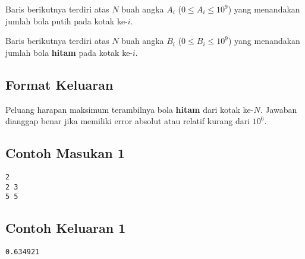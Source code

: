 \documentclass{article}
\begin{document}
Baris berikutnya terdiri atas $N$ buah angka $A_{i}$ ($0 \leq A_{i} \leq 10^9$) yang menandakan jumlah bola putih pada kotak ke-$i$.

Baris berikutnya terdiri atas $N$ buah angka $B_{i}$ ($0 \leq B_{i} \leq 10^9$) yang menandakan jumlah bola \textbf{hitam} pada kotak ke-$i$.

\subsection*{Format Keluaran}

Peluang harapan maksimum terambilnya bola \textbf{hitam} dari kotak ke-$N$. Jawaban dianggap benar jika memiliki error absolut atau relatif kurang dari $10^6$.
\\

\begin{multicols}{2}
\subsection*{Contoh Masukan 1}
\begin{lstlisting}
2
2 3
5 5
\end{lstlisting}
\columnbreak
\subsection*{Contoh Keluaran 1}
\begin{lstlisting}
0.634921
\end{lstlisting}
\vfill
\null
\end{multicols}
\end{document}
